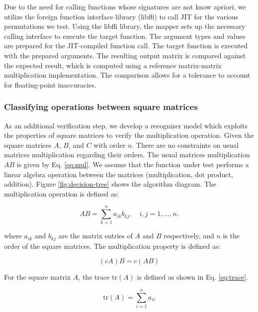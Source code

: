 \documentclass[manuscript,screen,review]{acmart}
\begin{document}
Due to the need for calling functions whose signatures are not know apriori, we utilize the foreign function interface library (libffi) to call JIT for the various permutations we test. Using the libffi library, the mapper sets up the necessary calling interface to execute the target function. The argument types and values are prepared for the JIT-compiled function call. The target function is executed with the prepared arguments. The resulting output matrix is compared against the expected result, which is computed using a reference matrix-matrix multiplication implementation. The comparison allows for a tolerance to account for floating-point inaccuracies.

\subsubsection{Classifying operations between square matrices}

As an additional verification step, we develop a recognizer model which exploits the properties of square matrices to verify the multiplication operation. Given the square matrices \(A\), \(B\), and \(C\) with order \(n\). There are no constraints on usual matrices multiplication regarding their orders. The usual matrices multiplication \(AB\) is given by Eq. \eqref{eq:mul}. We assume that the function under test performs a linear algebra operation between the matrices (multiplication, dot product, addition). Figure \ref{fig:decision-tree} shows the algorithm diagram. The multiplication operation is defined as:

\begin{equation}
	AB = \sum_{k=1}^{n} a_{ik} b_{kj}, \quad i, j = 1, \ldots, n.
	\label{eq:mul}
\end{equation}

where \(a_{ik}\) and \(b_{kj}\) are the matrix entries of \(A\) and \(B\) respectively, and \(n\) is the order of the square matrices. The multiplication property is defined as:

\begin{equation}
	 (cA)B = c(AB)
\end{equation}

For the square matrix \(A\), the trace \(\text{tr}(A)\) is defined as shown in Eq. \eqref{eq:trace}.

\begin{equation}
	\text{tr}(A) = \sum_{i=1}^{n} a_{ii}
	\label{eq:trace}
\end{equation}
\end{document}
